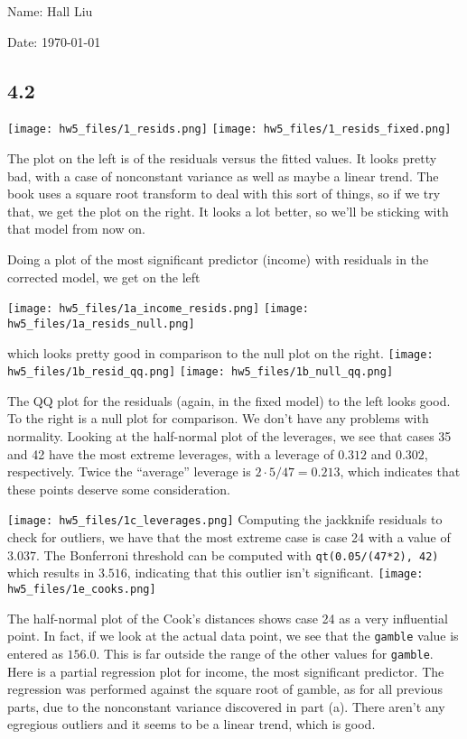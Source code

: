 \documentclass{article}
\begin{document}
Name: Hall Liu

Date: \today 
\vspace{1.5cm}

\subsection*{4.2}
\texttt{[image: hw5\_files/1\_resids.png]}
\texttt{[image: hw5\_files/1\_resids\_fixed.png]}

The plot on the left is of the residuals versus the fitted values. It looks pretty bad, with a case of nonconstant variance as well as maybe a linear trend. The book uses a square root transform to deal with this sort of things, so if we try that, we get the plot on the right. It looks a lot better, so we'll be sticking with that model from now on.

Doing a plot of the most significant predictor (income) with residuals in the corrected model, we get on the left

\texttt{[image: hw5\_files/1a\_income\_resids.png]}
\texttt{[image: hw5\_files/1a\_resids\_null.png]}

which looks pretty good in comparison to the null plot on the right.
\texttt{[image: hw5\_files/1b\_resid\_qq.png]}
\texttt{[image: hw5\_files/1b\_null\_qq.png]}

The QQ plot for the residuals (again, in the fixed model) to the left looks good. To the right is a null plot for comparison. We don't have any problems with normality.
Looking at the half-normal plot of the leverages, we see that cases 35 and 42 have the most extreme leverages, with a leverage of $0.312$ and $0.302$, respectively. Twice the ``average'' leverage is $2\cdot5/47=0.213$, which indicates that these points deserve some consideration.

\texttt{[image: hw5\_files/1c\_leverages.png]}
Computing the jackknife residuals to check for outliers, we have that the most extreme case is case 24 with a value of $3.037$. The Bonferroni threshold can be computed with \verb|qt(0.05/(47*2), 42)| which results in $3.516$, indicating that this outlier isn't significant.
\texttt{[image: hw5\_files/1e\_cooks.png]}

The half-normal plot of the Cook's distances shows case 24 as a very influential point. In fact, if we look at the actual data point, we see that the \verb|gamble| value is entered as $156.0$. This is far outside the range of the other values for \verb|gamble|. 
Here is a partial regression plot for income, the most significant predictor. The regression was performed against the square root of gamble, as for all previous parts, due to the nonconstant variance discovered in part (a). There aren't any egregious outliers and it seems to be a linear trend, which is good. 
\end{document}
